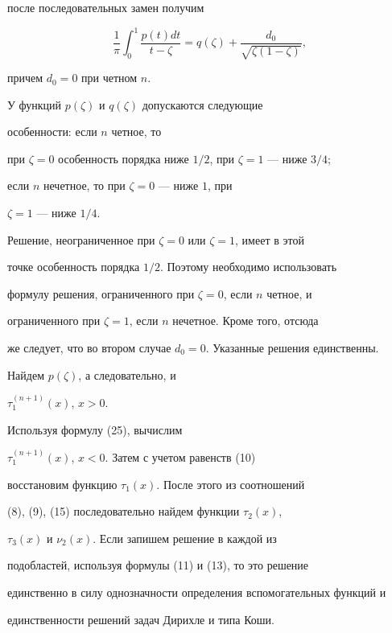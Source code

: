 после последовательных замен получим


$$


\frac{1}{\pi}\int^1_0\frac{p(t)dt}


{t -\zeta}=q(\zeta)+\frac{d_0}{\sqrt{\zeta(1-\zeta)}},


$$


причем $d_0=0$ при четном $n$.





У функций $p(\zeta)$ и $q(\zeta)$ допускаются следующие


особенности: если $n$ четное, то


при $\zeta=0$ особенность порядка ниже $1/2$, при $\zeta = 1$ --- ниже $3/4$;


если $n$ нечетное, то при $\zeta = 0$ --- ниже $1$, при


$\zeta = 1$ --- ниже $1/4$.





Решение, неограниченное при $\zeta=0$ или $\zeta =1$, имеет в этой


точке особенность порядка $1/2$. Поэтому необходимо использовать


формулу решения, ограниченного при $\zeta=0$, если $n$ четное, и


ограниченного при $\zeta=1$, если $n$ нечетное. Кроме того, отсюда 


же следует, что во втором случае $d_0=0$. Указанные решения единственны.





Найдем $ p(\zeta) $, а следовательно, и


$\tau_1^{(n+1)}(x)$, $x>0$.


Используя формулу (25), вычислим


$\tau_1^{(n+1)}(x)$, $x<0 $. Затем с учетом равенств (10)


восстановим функцию $\tau_1(x)$. После этого из соотношений


(8), (9), (15) последовательно найдем функции $\tau_2(x)$,


$\tau_3(x)$ и $\nu_2(x)$. Если запишем решение в каждой из


подобластей, используя формулы (11) и (13), то это решение


единственно в силу однозначности определения вспомогательных функций и


единственности решений задач Дирихле и типа Коши.





